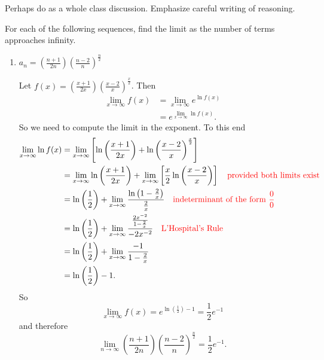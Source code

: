 \documentclass[handout]{ximera}
\begin{document}
\begin{instructorNotes}
Perhaps do as a whole class discussion.  
Emphasize careful writing of reasoning.
\end{instructorNotes}




\begin{problem}
For each of the following sequences, find the limit as the number of terms approaches infinity.
	\begin{enumerate}
	\item  $a_n = \left( \frac{n+1}{2n} \right) \left( \frac{n-2}{n} \right)^{\frac{n}{2}}$
	\begin{freeResponse}
	Let $f(x) =  \left( \frac{x+1}{2x} \right) \left( \frac{x-2}{x} \right)^{\frac{x}{2}}$.  
	Then
		\begin{align*}
		\lim_{x \to \infty} f(x) 
		&= \lim_{x \to \infty} e^{\ln f(x)}  \\
		&= e^{\lim_{x \to \infty} \ln f(x)}.
		\end{align*}
	So we need to compute the limit in the exponent.  To this end
		\begin{align*}
		\lim_{x \to \infty} \ln f(x) 
		&= \lim_{x \to \infty} \left[ \ln \left( \frac{x+1}{2x} \right) + \ln \left( \frac{x-2}{x} \right)^{\frac{x}{2}} \right]  \\
		&= \lim_{x \to \infty} \ln \left( \frac{x+1}{2x} \right) + \lim_{x \to \infty} \left[ \frac{x}{2} \ln \left( \frac{x-2}{x} \right) \right]  \quad {\color{red}\text{provided both limits exist}}  \\
		&= \ln \left( \frac{1}{2} \right) + \lim_{x \to \infty} \frac{\ln \left( 1 - \frac{2}{x} \right)}{\frac{2}{x}}  \quad {\color{red}\text{indeterminant of the form }\frac{0}{0}}\\
		&= \ln \left( \frac{1}{2} \right) + \lim_{x \to \infty} \frac{\frac{2x^{-2}}{1-\frac{2}{x}}}{-2x^{-2}}  \quad {\color{red}\text{L'Hospital's Rule}}  \\
		&= \ln \left( \frac{1}{2} \right) + \lim_{x \to \infty} \frac{-1}{1-\frac{2}{x}}  \\
		&= \ln \left( \frac{1}{2} \right) - 1.
		\end{align*}
	So 
		\[
		\lim_{x \to \infty} f(x) = e^{\ln \left( \frac{1}{2} \right) - 1} = \frac{1}{2} e^{-1}
		\]
	and therefore
		\[
		\lim_{n \to \infty} \left( \frac{n+1}{2n} \right) \left( \frac{n-2}{n} \right)^{\frac{n}{2}} = \frac{1}{2} e^{-1}.
		\]
	\end{freeResponse}
	

\end{enumerate}
\end{problem}
\end{document}
